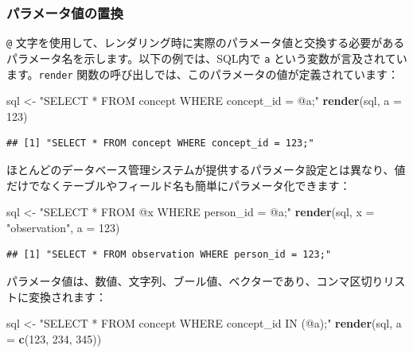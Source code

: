 \documentclass[
  11pt]{book}
\newenvironment{Shaded}{\begin{snugshade}}{\end{snugshade}}
\newcommand{\AttributeTok}[1]{\textcolor[rgb]{0.13,0.29,0.53}{#1}}
\newcommand{\DecValTok}[1]{\textcolor[rgb]{0.00,0.00,0.81}{#1}}
\newcommand{\FunctionTok}[1]{\textcolor[rgb]{0.13,0.29,0.53}{\textbf{#1}}}
\newcommand{\NormalTok}[1]{#1}
\newcommand{\OtherTok}[1]{\textcolor[rgb]{0.56,0.35,0.01}{#1}}
\newcommand{\StringTok}[1]{\textcolor[rgb]{0.31,0.60,0.02}{#1}}
\theoremstyle{definition}
\theoremstyle{definition}
\theoremstyle{definition}
\theoremstyle{definition}
\theoremstyle{remark}
\begin{document}
\subsubsection*{パラメータ値の置換}\label{ux30d1ux30e9ux30e1ux30fcux30bfux5024ux306eux7f6eux63db}

\texttt{@} 文字を使用して、レンダリング時に実際のパラメータ値と交換する必要があるパラメータ名を示します。以下の例では、SQL内で \texttt{a} という変数が言及されています。\texttt{render} 関数の呼び出しでは、このパラメータの値が定義されています：

\begin{Shaded}
\begin{Highlighting}[]
\NormalTok{sql }\OtherTok{\textless{}{-}} \StringTok{"SELECT * FROM concept WHERE concept\_id = @a;"}
\FunctionTok{render}\NormalTok{(sql, }\AttributeTok{a =} \DecValTok{123}\NormalTok{)}
\end{Highlighting}
\end{Shaded}

\begin{verbatim}
## [1] "SELECT * FROM concept WHERE concept_id = 123;"
\end{verbatim}

ほとんどのデータベース管理システムが提供するパラメータ設定とは異なり、値だけでなくテーブルやフィールド名も簡単にパラメータ化できます：

\begin{Shaded}
\begin{Highlighting}[]
\NormalTok{sql }\OtherTok{\textless{}{-}} \StringTok{"SELECT * FROM @x WHERE person\_id = @a;"}
\FunctionTok{render}\NormalTok{(sql, }\AttributeTok{x =} \StringTok{"observation"}\NormalTok{, }\AttributeTok{a =} \DecValTok{123}\NormalTok{)}
\end{Highlighting}
\end{Shaded}

\begin{verbatim}
## [1] "SELECT * FROM observation WHERE person_id = 123;"
\end{verbatim}

パラメータ値は、数値、文字列、ブール値、ベクターであり、コンマ区切りリストに変換されます：

\begin{Shaded}
\begin{Highlighting}[]
\NormalTok{sql }\OtherTok{\textless{}{-}} \StringTok{"SELECT * FROM concept WHERE concept\_id IN (@a);"}
\FunctionTok{render}\NormalTok{(sql, }\AttributeTok{a =} \FunctionTok{c}\NormalTok{(}\DecValTok{123}\NormalTok{, }\DecValTok{234}\NormalTok{, }\DecValTok{345}\NormalTok{))}
\end{Highlighting}
\end{Shaded}
\end{document}
